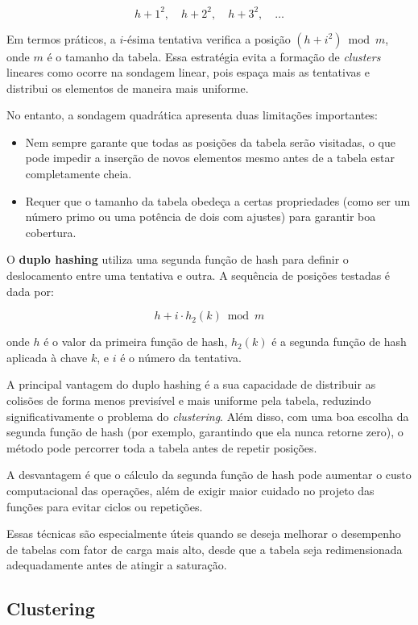 \[
h + 1^2, \quad h + 2^2, \quad h + 3^2, \quad \ldots
\]

Em termos práticos, a $i$-ésima tentativa verifica a posição $(h + i^2) \bmod m$, onde $m$ é o tamanho da tabela. 
Essa estratégia evita a formação de \textit{clusters} lineares como ocorre na sondagem linear, pois espaça mais as tentativas e distribui os elementos de maneira mais uniforme.

No entanto, a sondagem quadrática apresenta duas limitações importantes:

\begin{itemize}
  \item Nem sempre garante que todas as posições da tabela serão visitadas, o que pode impedir a inserção de novos elementos mesmo antes de a tabela estar completamente cheia.
  \item Requer que o tamanho da tabela obedeça a certas propriedades (como ser um número primo ou uma potência de dois com ajustes) para garantir boa cobertura.
\end{itemize}

O \textbf{duplo hashing} utiliza uma segunda função de hash para definir o deslocamento entre uma tentativa e outra. 
A sequência de posições testadas é dada por:

\[
h + i \cdot h_2(k) \bmod m
\]

onde $h$ é o valor da primeira função de hash, $h_2(k)$ é a segunda função de hash aplicada à chave $k$, e $i$ é o número da tentativa.

A principal vantagem do duplo hashing é a sua capacidade de distribuir as colisões de forma menos previsível e mais uniforme pela tabela, reduzindo significativamente o problema do \textit{clustering}. 
Além disso, com uma boa escolha da segunda função de hash (por exemplo, garantindo que ela nunca retorne zero), o método pode percorrer toda a tabela antes de repetir posições.

A desvantagem é que o cálculo da segunda função de hash pode aumentar o custo computacional das operações, além de exigir maior cuidado no projeto das funções para evitar ciclos ou repetições.

Essas técnicas são especialmente úteis quando se deseja melhorar o desempenho de tabelas com fator de carga mais alto, desde que a tabela seja redimensionada adequadamente antes de atingir a saturação.

\subsection*{Clustering}

